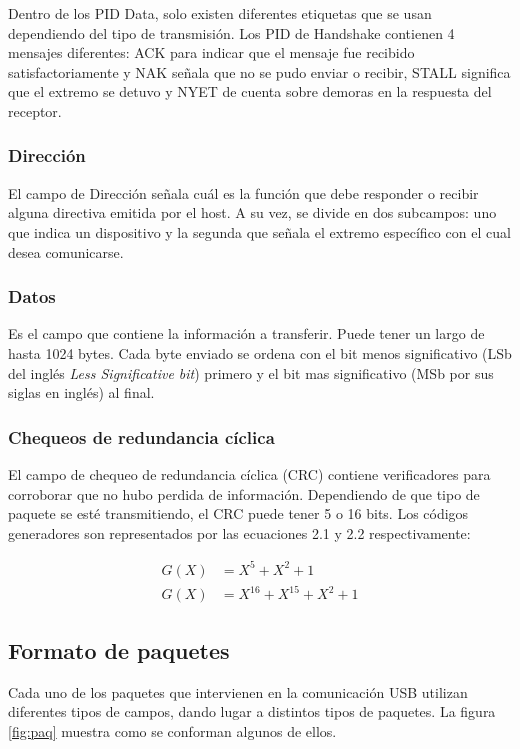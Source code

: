 		Dentro de los PID Data, solo existen diferentes etiquetas que se usan dependiendo del tipo de transmisión. Los PID de Handshake contienen 4 mensajes diferentes: ACK para indicar que el mensaje fue recibido satisfactoriamente y NAK señala que no se pudo enviar o recibir, STALL significa que el extremo se detuvo y NYET de cuenta sobre demoras en la respuesta del receptor.\\
	
	\subsubsection*{Dirección}
		El campo de Dirección señala cuál es la función que debe responder o recibir alguna directiva emitida por el host. A su vez, se divide en dos subcampos: uno que indica un dispositivo y la segunda que señala el extremo específico con el cual desea comunicarse.\\

	\subsubsection*{Datos}
		Es el campo que contiene la información a transferir. Puede tener un largo de hasta 1024 bytes. Cada byte enviado se ordena con el bit menos significativo (LSb del inglés {\it Less Significative bit}) primero y el bit mas significativo (MSb por sus siglas en inglés) al final.

	\subsubsection*{Chequeos de redundancia cíclica}
		El campo de chequeo de redundancia cíclica (CRC) contiene verificadores para corroborar que no hubo perdida de información. Dependiendo de que tipo de paquete se esté transmitiendo, el CRC puede tener 5 o 16 bits. Los códigos generadores son representados por las ecuaciones 2.1 y 2.2 respectivamente:
	
		\begin{center}
			\begin{align}
				G(X)&=X^5+X^2+1\\
				G(X)&=X^16+X^15+X^2+1
			\end{align}
		\end{center}
	
\subsection{Formato de paquetes}
	Cada uno de los paquetes que intervienen en la comunicación USB utilizan diferentes tipos de campos, dando lugar a distintos tipos de paquetes. La figura \ref{fig:paq} muestra como se conforman algunos de ellos.\\ 

